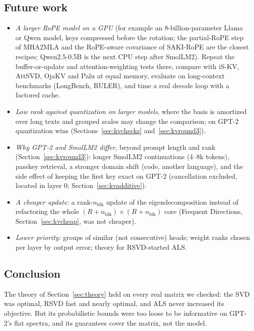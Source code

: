 \documentclass[10pt]{article}
\theoremstyle{plain}
\theoremstyle{definition}
\theoremstyle{remark}
\begin{document}
\subsection{Future work}
\label{sec:future}
\begin{itemize}[leftmargin=2em,itemsep=1pt]
\item \emph{A larger RoPE model on a GPU} (for example an 8-billion-parameter Llama or Qwen model, keys compressed before the rotation; the partial-RoPE step of MHA2MLA \cite{ji2025mha2mla} and the RoPE-aware covariance of SAKI-RoPE \cite{saki2026} are the closest recipes; Qwen2.5-0.5B \cite{qwen2025} is the next CPU step after SmolLM2). Repeat the buffer-or-update and attention-weighting tests there, compare with iS-KV, AttSVD, OjaKV and Palu at equal memory, evaluate on long-context benchmarks (LongBench, RULER), and time a real decode loop with a factored cache.
\item \emph{Low rank against quantization on larger models}, where the basis is amortized over long texts and grouped scales may change the comparison; on GPT-2 quantization wins (Sections~\ref{sec:kvchecks} and~\ref{sec:kvround3}).
\item \emph{Why GPT-2 and SmolLM2 differ}, beyond prompt length and rank (Section~\ref{sec:kvround3}): longer SmolLM2 continuations (4--8k tokens), passkey retrieval, a stronger domain shift (code, another language), and the side effect of keeping the first key exact on GPT-2 (cancellation excluded, located in layer 0; Section~\ref{sec:kvadditive}).
\item \emph{A cheaper update:} a rank-$n_{\mathrm{blk}}$ update of the eigendecomposition instead of refactoring the whole $(R+n_{\mathrm{blk}})\times(R+n_{\mathrm{blk}})$ core (Frequent Directions, Section~\ref{sec:kvcheap}, was not cheaper).
\item \emph{Lower priority:} groups of similar (not consecutive) heads; weight ranks chosen per layer by output error; theory for RSVD-started ALS.
\end{itemize}

\subsection{Conclusion}
\label{sec:conclusion}

The theory of Section~\ref{sec:theory} held on every real matrix we checked: the SVD was optimal, RSVD fast and nearly optimal, and ALS never increased its objective. But its probabilistic bounds were too loose to be informative on GPT-2's flat spectra, and its guarantees cover the matrix, not the model.
\end{document}
